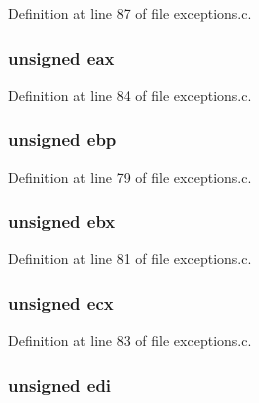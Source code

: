 Definition at line 87 of file exceptions.c.

\hypertarget{structregisters_a6d4f2bc514bdffb925ddb14d37a12d9d}{
\subsubsection[{eax}]{\setlength{\rightskip}{0pt plus 5cm}unsigned {\bf eax}}}
\label{structregisters_a6d4f2bc514bdffb925ddb14d37a12d9d}


Definition at line 84 of file exceptions.c.

\hypertarget{structregisters_a0b23dfe5ba8a9bc90315a06784350cb2}{
\subsubsection[{ebp}]{\setlength{\rightskip}{0pt plus 5cm}unsigned {\bf ebp}}}
\label{structregisters_a0b23dfe5ba8a9bc90315a06784350cb2}


Definition at line 79 of file exceptions.c.

\hypertarget{structregisters_acff6a7e560519d3d068076c43be5a986}{
\subsubsection[{ebx}]{\setlength{\rightskip}{0pt plus 5cm}unsigned {\bf ebx}}}
\label{structregisters_acff6a7e560519d3d068076c43be5a986}


Definition at line 81 of file exceptions.c.

\hypertarget{structregisters_a356bd1510740b64868b03ae84a80010e}{
\subsubsection[{ecx}]{\setlength{\rightskip}{0pt plus 5cm}unsigned {\bf ecx}}}
\label{structregisters_a356bd1510740b64868b03ae84a80010e}


Definition at line 83 of file exceptions.c.

\hypertarget{structregisters_aa8328d7107121caab9a02f51ec3bf4de}{
\subsubsection[{edi}]{\setlength{\rightskip}{0pt plus 5cm}unsigned {\bf edi}}}
\label{structregisters_aa8328d7107121caab9a02f51ec3bf4de}


